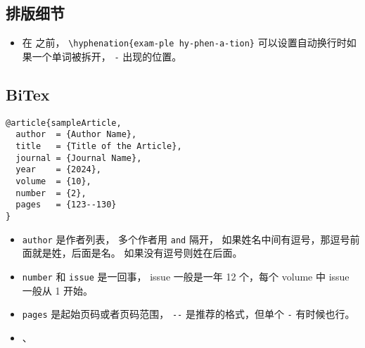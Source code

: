 
\begin{issues}
\issueDraft
\end{issues}

\subsection{排版细节}
\begin{itemize}
\item 在 \verb`` 之前， \verb`\hyphenation{exam-ple hy-phen-a-tion}` 可以设置自动换行时如果一个单词被拆开， \verb`-` 出现的位置。
\end{itemize}

\subsection{BiTex}

\begin{lstlisting}[language=none, caption=BibTeX 的例子]
@article{sampleArticle,
  author  = {Author Name},
  title   = {Title of the Article},
  journal = {Journal Name},
  year    = {2024},
  volume  = {10},
  number  = {2},
  pages   = {123--130}
}
\end{lstlisting}

\begin{itemize}
\item \verb`author` 是作者列表， 多个作者用 \verb`and` 隔开， 如果姓名中间有逗号，那逗号前面就是姓，后面是名。 如果没有逗号则姓在后面。
\item \verb`number` 和 \verb`issue` 是一回事， issue 一般是一年 12 个，每个 volume 中 issue 一般从 1 开始。
\item \verb`pages` 是起始页码或者页码范围， \verb`--` 是推荐的格式，但单个 \verb`-` 有时候也行。
\item 、
\end{itemize}
